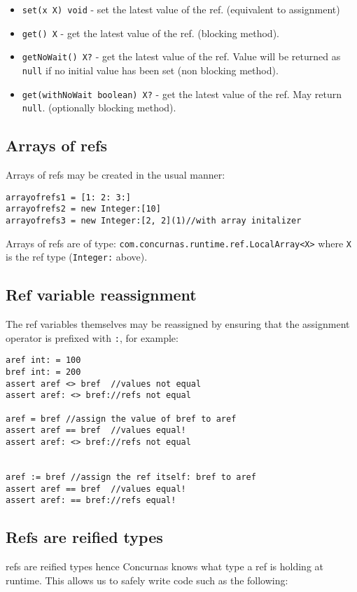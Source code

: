\documentclass[conc-doc]{subfiles}
\begin{document}
\begin{itemize}
	\item \lstinline{set(x X) void} - set the latest value of the ref. (equivalent to assignment)
	\item \lstinline{get() X} - get the latest value of the ref. (blocking method).
	\item \lstinline{getNoWait() X?} - get the latest value of the ref. Value will be returned as \lstinline{null} if no initial value has been set (non blocking method).
	\item \lstinline{get(withNoWait boolean) X?} - get the latest value of the ref. May return \lstinline{null}. (optionally blocking method).
\end{itemize}

\subsection{Arrays of refs}
Arrays of refs may be created in the usual manner:

\begin{lstlisting}
arrayofrefs1 = [1: 2: 3:]
arrayofrefs2 = new Integer:[10]
arrayofrefs3 = new Integer:[2, 2](1)//with array initalizer
\end{lstlisting}

Arrays of refs are of type: \lstinline{com.concurnas.runtime.ref.LocalArray<X>} where \lstinline{X} is the ref type (\lstinline{Integer:} above).

\subsection{Ref variable reassignment}
The ref variables themselves may be reassigned by ensuring that the assignment operator is prefixed with \lstinline{:}, for example:

\begin{lstlisting}
aref int: = 100
bref int: = 200
assert aref <> bref  //values not equal
assert aref: <> bref://refs not equal

aref = bref //assign the value of bref to aref
assert aref == bref  //values equal!
assert aref: <> bref://refs not equal


aref := bref //assign the ref itself: bref to aref
assert aref == bref  //values equal!
assert aref: == bref://refs equal!
\end{lstlisting}

\subsection{Refs are reified types}
refs are reified types hence Concurnas knows what type a ref is holding at runtime. This allows us to safely write code such as the following:
\end{document}
